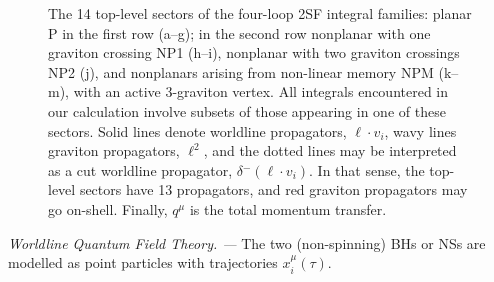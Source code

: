 \documentclass[twocolumn,superscriptaddress,amsmath, amssymb, amsfonts,preprintnumbers,aps,prd,longbibliography,nofootinbib]{revtex4-2}
\renewcommand{\sec}[1]{\textit{#1. --- }}
\def\dd{\delta\!\!\!{}^-\!}
\begin{document}
\begin{figure}[ht!]
\begin{subfigure}{0.13\textwidth}
  \caption{}
\end{subfigure}
\caption{\small
{The 14 top-level sectors of the four-loop 2SF integral families:
planar P in the first row (a--g);
in the second row nonplanar with one graviton crossing NP1 (h--i),
nonplanar with two graviton crossings NP2 (j),
and nonplanars arising from non-linear memory NPM (k--m),
with an active 3-graviton vertex.
All integrals encountered in our calculation involve subsets of
those appearing in one of these sectors.}
Solid lines denote worldline propagators, {$\ell\cdot v_i$},
wavy lines graviton propagators, {$\ell^2$},
and the dotted lines may be interpreted as a cut worldline propagator, $\dd(\ell\cdot v_{i})$.
In that sense, the top-level sectors have 13 propagators,
and red graviton propagators may go on-shell.
Finally, $q^{\mu}$ is the total momentum transfer.}
\label{fig:diagrams}
\end{figure}


\sec{Worldline Quantum Field Theory}
The two (non-spinning) BHs or NSs are modelled as point particles with trajectories
$x_{i}^{\mu}(\tau)$.
\end{document}
